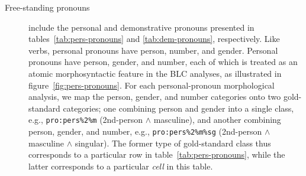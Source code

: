 \begin{description}
			
			

\item[Free-standing pronouns] include the personal and demonstrative pronouns presented in 
tables~\ref{tab:pers-pronouns} and \ref{tab:dem-pronouns}, respectively.
Like verbs, personal pronouns have person, number, and gender. 
Personal pronouns have person, gender, and number, each of which is treated as 
an atomic morphosyntactic feature in the BLC analyses, as illustrated in 
figure~\ref{fig:pers-pronouns}. For each personal-pronoun morphological analysis, 
we map the person, gender, and number categories onto
two gold-standard categories; one combining person and gender 
into a single class, e.g., \texttt{pro:pers\%2\%m} (2nd-person $\land$ masculine), 
and another combining person, gender, and number, 
e.g., \texttt{pro:pers\%2\%m\%sg} (2nd-person $\land$ masculine $\land$ singular). 
The former type of gold-standard class
thus corresponds to a particular row in table~\ref{tab:pers-pronouns}, 
while the latter corresponds to a particular \emph{cell} in this table.


\end{description}
